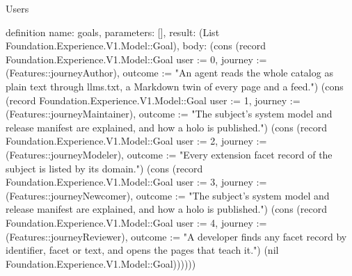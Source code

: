 \begin{lexlean}{Users}
\begin{semanticmodule}
definition{
  name: goals,
  parameters: [],
  result: (List Foundation.Experience.V1.Model::Goal),
  body: (cons (record Foundation.Experience.V1.Model::Goal {user := 0, journey := (Features::journeyAuthor), outcome := "An agent reads the whole catalog as plain text through llms.txt, a Markdown twin of every page and a feed."}) (cons (record Foundation.Experience.V1.Model::Goal {user := 1, journey := (Features::journeyMaintainer), outcome := "The subject's system model and release manifest are explained, and how a holo is published."}) (cons (record Foundation.Experience.V1.Model::Goal {user := 2, journey := (Features::journeyModeler), outcome := "Every extension facet record of the subject is listed by its domain."}) (cons (record Foundation.Experience.V1.Model::Goal {user := 3, journey := (Features::journeyNewcomer), outcome := "The subject's system model and release manifest are explained, and how a holo is published."}) (cons (record Foundation.Experience.V1.Model::Goal {user := 4, journey := (Features::journeyReviewer), outcome := "A developer finds any facet record by identifier, facet or text, and opens the pages that teach it."}) (nil Foundation.Experience.V1.Model::Goal))))))
}


\end{semanticmodule}
\end{lexlean}
